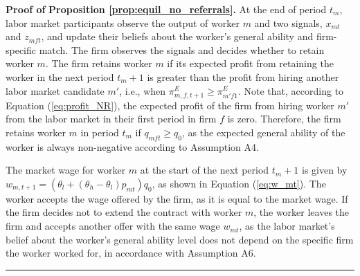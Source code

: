 \documentclass[12pt]{article}
\newenvironment{proof}[1][Proof of]{\noindent\textbf{#1} }{\ \rule{0.5em}{0.5em}}
\begin{document}
\begin{proof}
    \textbf{Proposition \ref{prop:equil_no_referrals}.} 
    At the end of period $t_m$, labor market participants observe the output of worker $m$ and two signals, $x_{mt}$ and $z_{mft}$, and update their beliefs about the worker's general ability and firm-specific match. The firm observes the signals and decides whether to retain worker $m$. The firm retains worker $m$ if its expected profit from retaining the worker in the next period $t_m+1$ is greater than the profit from hiring another labor market candidate $m'$, i.e., when $\pi^E_{m,f,t+1} \geq \pi^E_{m'f1}$. Note that, according to Equation (\ref{eq:profit_NR}), the expected profit of the firm from hiring worker $m'$ from the labor market in their first period in firm $f$ is zero. Therefore, the firm retains worker $m$ in period $t_m$ if $q_{mft} \geq q_0$, as the expected general ability of the worker is always non-negative according to Assumption A4. 
    
    The market wage for worker $m$ at the start of the next period $t_m+1$ is given by $w_{m,t+1} = \left( \theta_l + (\theta_h - \theta_l)p_{mt}\right) q_0$, as shown in Equation (\ref{eq:w_mt}).  The worker accepts the wage offered by the firm, as it is equal to the market wage. If the firm decides not to extend the contract with worker $m$, the worker leaves the firm and accepts another offer with the same wage $w_{mt}$, as the labor market's belief about the worker's general ability level does not depend on the specific firm the worker worked for, in accordance with Assumption A6.
\end{proof}
\end{document}
